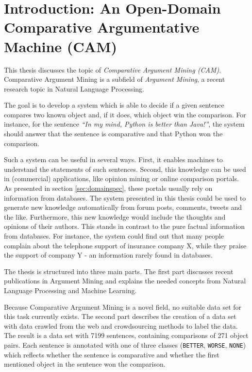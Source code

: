 \chapter{Introduction: An Open-Domain Comparative Argumentative Machine (CAM)}
This thesis discusses the topic of \emph{Comparative Argument Mining (CAM)}. Comparative Argument Mining is a subfield of \emph{Argument Mining}, a recent research topic in Natural Language Processing.

The goal is to develop a system which is able to decide if a given sentence compares two known object and, if it does, which object win the comparison. For instance, for the sentence \emph{\enquote{In my mind, Python is better than Java!}}, the system should answer that the sentence is comparative and that Python won the comparison.

Such a system can be useful in several ways. First, it enables machines to understand the statements of such sentences. Second, this knowledge can be used in (commercial) applications, like opinion mining or online comparison portals. As presented in section \ref{sec:domainspec}, these portals usually rely on information from databases. The system presented in this thesis could be used to generate new knowledge automatically from forum posts, comments, tweets and the like. Furthermore, this new knowledge would include the thoughts and opinions of their authors. This stands in contrast to the pure factual information from databases. For instance, the system could find out that many people complain about the telephone support of insurance company X, while they praise the support of company Y - an information rarely found in databases.\newline

The thesis is structured into three main parts. The first part discusses recent publications in Argument Mining and explains the needed concepts from Natural Language Processing and Machine Learning.

Because Comparative Argument Mining is a novel field, no suitable data set for this task currently exists. The second part describes the creation of a data set with data crawled from the web and crowdsourcing methods to label the data. The result is a data set with 7199 sentences, containing comparisons of 271 object pairs. Each sentence is annotated with one of three classes (\texttt{BETTER}, \texttt{WORSE}, \texttt{NONE}) which reflects whether the sentence is comparative and whether the first mentioned object in the sentence won the comparison.

